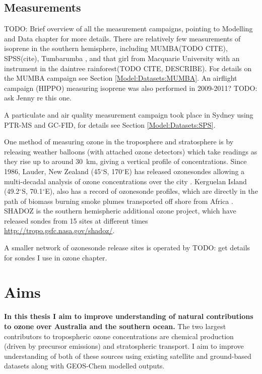   
  \subsection{Measurements}
    
    TODO: Brief overview of all the measurement campaigns, pointing to Modelling and Data chapter for more details.
    There are relatively few measurements of isoprene in the southern hemisphere, including MUMBA(TODO CITE), SPSS(cite), Tumbarumba \parencite{Emmerson2016}, and that girl from Macquarie University with an instrument in the daintree rainforest(TODO CITE, DESCRIBE).
    For details on the MUMBA campaign see Section \ref{Model:Datasets:MUMBA}.
    An airflight campaign (HIPPO) measuring isoprene was also performed in 2009-2011? TODO: ask Jenny re this one.
    
    A particulate and air quality measurement campaign took place in Sydney using PTR-MS and GC-FID, for details see Section \ref{Model:Datasets:SPS}.
    
    One method of measuring ozone in the troposphere and stratosphere is by releasing weather balloons (with attached ozone detectors) which take readings as they rise up to around 30~km, giving a vertical profile of concentrations.
    Since 1986, Lauder, New Zealand (45$^{\circ}$S, 170$^{\circ}$E) has released ozonesondes allowing a multi-decadal analysis of ozone concentrations over the city \parencite{Brinksma2002}.
    Kerguelan Island (49.2$^{\circ}$S, 70.1$^{\circ}$E), also has a record of ozonesonde profiles, which are directly in the path of biomass burning smoke plumes transported off shore from Africa \parencite{Baray2012}.
    SHADOZ is the southern hemispheric additional ozone project, which have released sondes from 15 sites at different times \url{http://tropo.gsfc.nasa.gov/shadoz/}.
    
    A smaller network of ozonesonde release sites is operated by TODO: get details for sondes I use in ozone chapter.
  
\section{Aims}
\label{LR:Aims}

  \textbf{In this thesis I aim to improve understanding of natural contributions to ozone over Australia and the southern ocean.}
  The two largest contributors to tropospheric ozone concentrations are chemical production (driven by precursor emissions) and stratospheric transport.
  I aim to improve understanding of both of these sources using existing satellite and ground-based datasets along with GEOS-Chem modelled outputs.
  
